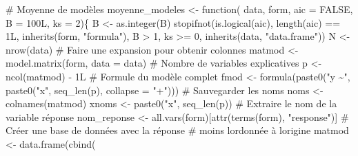 \documentclass[
  11pt,
  letterpaper,
]{book}
\newenvironment{Shaded}{\begin{snugshade}}{\end{snugshade}}
\newcommand{\AttributeTok}[1]{\textcolor[rgb]{0.40,0.45,0.13}{#1}}
\newcommand{\CommentTok}[1]{\textcolor[rgb]{0.37,0.37,0.37}{#1}}
\newcommand{\ConstantTok}[1]{\textcolor[rgb]{0.56,0.35,0.01}{#1}}
\newcommand{\ControlFlowTok}[1]{\textcolor[rgb]{0.00,0.23,0.31}{#1}}
\newcommand{\DecValTok}[1]{\textcolor[rgb]{0.68,0.00,0.00}{#1}}
\newcommand{\FunctionTok}[1]{\textcolor[rgb]{0.28,0.35,0.67}{#1}}
\newcommand{\NormalTok}[1]{\textcolor[rgb]{0.00,0.23,0.31}{#1}}
\newcommand{\OtherTok}[1]{\textcolor[rgb]{0.00,0.23,0.31}{#1}}
\newcommand{\SpecialCharTok}[1]{\textcolor[rgb]{0.37,0.37,0.37}{#1}}
\newcommand{\StringTok}[1]{\textcolor[rgb]{0.13,0.47,0.30}{#1}}
\theoremstyle{definition}
\theoremstyle{remark}
\begin{document}
\begin{Shaded}
\begin{Highlighting}[]
\CommentTok{\# Moyenne de modèles}
\NormalTok{moyenne\_modeles }\OtherTok{\textless{}{-}} \ControlFlowTok{function}\NormalTok{(}
\NormalTok{    data, }
\NormalTok{    form, }
    \AttributeTok{aic =} \ConstantTok{FALSE}\NormalTok{, }
    \AttributeTok{B =}\NormalTok{ 100L,}
    \AttributeTok{ks =} \DecValTok{2}\NormalTok{)\{}
\NormalTok{  B }\OtherTok{\textless{}{-}} \FunctionTok{as.integer}\NormalTok{(B)}
  \FunctionTok{stopifnot}\NormalTok{(}\FunctionTok{is.logical}\NormalTok{(aic),}
            \FunctionTok{length}\NormalTok{(aic) }\SpecialCharTok{==}\NormalTok{ 1L,}
            \FunctionTok{inherits}\NormalTok{(form, }\StringTok{"formula"}\NormalTok{),}
\NormalTok{            B }\SpecialCharTok{\textgreater{}} \DecValTok{1}\NormalTok{,}
\NormalTok{            ks }\SpecialCharTok{\textgreater{}=} \DecValTok{0}\NormalTok{,}
            \FunctionTok{inherits}\NormalTok{(data, }\StringTok{"data.frame"}\NormalTok{))}
\NormalTok{  N }\OtherTok{\textless{}{-}} \FunctionTok{nrow}\NormalTok{(data)}
  \CommentTok{\# Faire une expansion pour obtenir colonnes}
\NormalTok{  matmod }\OtherTok{\textless{}{-}} \FunctionTok{model.matrix}\NormalTok{(form, }\AttributeTok{data =}\NormalTok{ data)}
  \CommentTok{\# Nombre de variables explicatives}
\NormalTok{  p }\OtherTok{\textless{}{-}} \FunctionTok{ncol}\NormalTok{(matmod) }\SpecialCharTok{{-}}\NormalTok{ 1L}
  \CommentTok{\# Formule du modèle complet}
\NormalTok{  fmod }\OtherTok{\textless{}{-}} \FunctionTok{formula}\NormalTok{(}\FunctionTok{paste0}\NormalTok{(}\StringTok{"y \textasciitilde{}"}\NormalTok{, }\FunctionTok{paste0}\NormalTok{(}\StringTok{"x"}\NormalTok{, }\FunctionTok{seq\_len}\NormalTok{(p), }\AttributeTok{collapse =} \StringTok{"+"}\NormalTok{)))}
  \CommentTok{\# Sauvegarder les noms}
\NormalTok{  noms }\OtherTok{\textless{}{-}} \FunctionTok{colnames}\NormalTok{(matmod)}
\NormalTok{  xnoms }\OtherTok{\textless{}{-}} \FunctionTok{paste0}\NormalTok{(}\StringTok{"x"}\NormalTok{, }\FunctionTok{seq\_len}\NormalTok{(p))}
  \CommentTok{\# Extraire le nom de la variable réponse}
\NormalTok{  nom\_reponse }\OtherTok{\textless{}{-}} \FunctionTok{all.vars}\NormalTok{(form)[}\FunctionTok{attr}\NormalTok{(}\FunctionTok{terms}\NormalTok{(form), }\StringTok{"response"}\NormalTok{)]}
  \CommentTok{\# Créer une base de données avec la réponse}
  \CommentTok{\# moins l\textquotesingle{}ordonnée à l\textquotesingle{}origine}
\NormalTok{  matmod }\OtherTok{\textless{}{-}} \FunctionTok{data.frame}\NormalTok{(}\FunctionTok{cbind}\NormalTok{(}

\end{Highlighting}
\end{Shaded}
\end{document}
